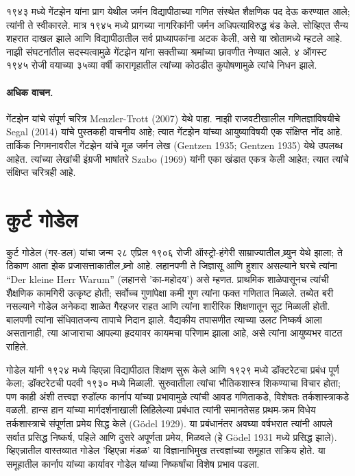 १९४३ मध्ये गेंटझेन यांना प्राग येथील जर्मन विद्यापीठाच्या गणित संस्थेत शैक्षणिक पद देऊ करण्यात आले; त्यांनी ते स्वीकारले. मात्र १९४५ मध्ये प्रागच्या नागरिकांनी जर्मन अधिपत्याविरुद्ध बंड केले. सोव्हिएत सैन्य शहरात दाखल झाले आणि विद्यापीठातील सर्व प्राध्यापकांना अटक केली, असे या स्रोतामध्ये म्हटले आहे. नाझी संघटनांतील सदस्यत्वामुळे गेंटझेन यांना सक्तीच्या श्रमांच्या छावणीत नेण्यात आले. ४ ऑगस्ट १९४५ रोजी वयाच्या ३५व्या वर्षी कारागृहातील त्यांच्या कोठडीत कुपोषणामुळे त्यांचे निधन झाले.

\paragraph{अधिक वाचन.}
गेंटझेन यांचे संपूर्ण चरित्र Menzler-Trott (2007) येथे पाहा. नाझी राजवटीखालील गणितज्ञांविषयीचे Segal (2014) यांचे पुस्तकही वाचनीय आहे; त्यात गेंटझेन यांच्या आयुष्याविषयी एक संक्षिप्त नोंद आहे. तार्किक निगमनावरील गेंटझेन यांचे मूळ जर्मन लेख (Gentzen 1935; Gentzen 1935) येथे उपलब्ध आहेत. त्यांच्या लेखांची इंग्रजी भाषांतरे Szabo (1969) यांनी एका खंडात एकत्र केली आहेत; त्यात त्यांचे संक्षिप्त चरित्रही आहे.














\section{कुर्ट गोडेल}\label{his:bio:god:sec}



कुर्ट गोडेल (\textsc{गर}-डल) यांचा जन्म २८ एप्रिल १९०६ रोजी ऑस्ट्रो-हंगेरी साम्राज्यातील ब्र्युन येथे झाला; ते ठिकाण आता झेक प्रजासत्ताकातील ब्र्नो आहे. लहानपणी ते जिज्ञासू आणि हुशार असल्याने घरचे त्यांना “Der kleine Herr Warum” (लहानसे 'का-महोदय') असे म्हणत. प्राथमिक शाळेपासूनच त्यांची शैक्षणिक कामगिरी उत्कृष्ट होती; सर्वोच्च गुणांपेक्षा कमी गुण त्यांना फक्त गणितात मिळाले. तब्येत बरी नसल्याने गोडेल अनेकदा शाळेत गैरहजर राहत आणि त्यांना शारीरिक शिक्षणातून सूट मिळाली होती. बालपणी त्यांना संधिवातजन्य तापाचे निदान झाले. वैद्यकीय तपासणीत त्याच्या उलट निष्कर्ष आला असतानाही, त्या आजाराचा आपल्या हृदयावर कायमचा परिणाम झाला आहे, असे त्यांना आयुष्यभर वाटत राहिले.

गोडेल यांनी १९२४ मध्ये व्हिएन्ना विद्यापीठात शिक्षण सुरू केले आणि १९२९ मध्ये डॉक्टरेटचा प्रबंध पूर्ण केला; डॉक्टरेटची पदवी १९३० मध्ये मिळाली. सुरुवातीला त्यांचा भौतिकशास्त्र शिकण्याचा विचार होता; पण काही अंशी तत्त्वज्ञ रुडॉल्फ कार्नाप यांच्या प्रभावामुळे त्यांची आवड गणिताकडे, विशेषतः तर्कशास्त्राकडे वळली. हान्स हान यांच्या मार्गदर्शनाखाली लिहिलेल्या प्रबंधात त्यांनी समानतेसह प्रथम-क्रम विधेय तर्कशास्त्राचे संपूर्णता प्रमेय सिद्ध केले (G\"odel 1929). या प्रबंधानंतर अवघ्या वर्षभरात त्यांनी आपले सर्वात प्रसिद्ध निष्कर्ष, पहिले आणि दुसरे अपूर्णता प्रमेय, मिळवले (हे G{\"{o}}del 1931 मध्ये प्रसिद्ध झाले). व्हिएन्नातील वास्तव्यात गोडेल 'व्हिएन्ना मंडळ' या विज्ञानाभिमुख तत्त्वज्ञांच्या समूहात सक्रिय होते. या समूहातील कार्नाप यांच्या कार्यावर गोडेल यांच्या निष्कर्षांचा विशेष प्रभाव पडला.

